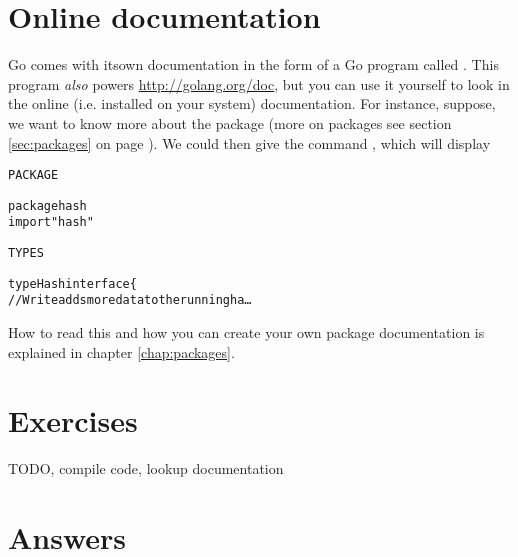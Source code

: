 \section{Online documentation}
Go comes with itsown  documentation in the form of a Go program called
. This program \emph{also} powers
\url{http://golang.org/doc}, but you can use it yourself to look
in the online (i.e. installed on your system) documentation. For
instance, suppose, we want to know more about the package  
(more on packages see section \ref{sec:packages} on page
\pageref{sec:packages}). We could then give the command
, which will display
\begin{alltt}
PACKAGE

package hash
import "hash"

TYPES

type Hash interface \{
    // Write adds more data to the running ha \ldots
\end{alltt}
How to read this and how you can create your own package documentation
is explained in chapter \ref{chap:packages}.

\section{Exercises}


TODO, compile code, lookup documentation

\cleardoublepage
\section{Answers}
\shipoutAnswer
